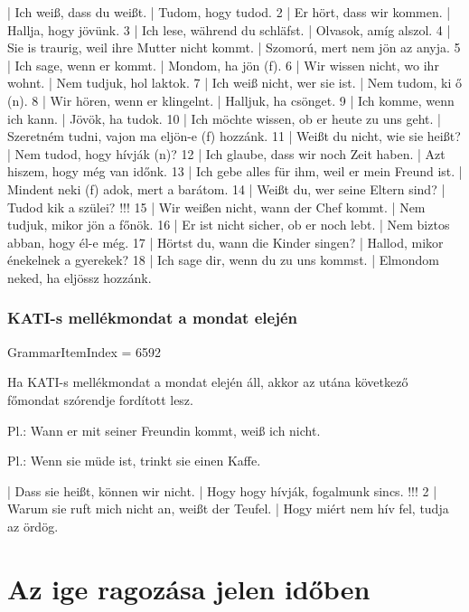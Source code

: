 \documentclass{article}
\newenvironment{desc}{\verbatim}{\endverbatim}
\newenvironment{exmp}{\verbatim}{\endverbatim}
\begin{document}
\begin{exmp}
1 | Ich weiß, dass du weißt. | Tudom, hogy tudod.
2 | Er hört, dass wir kommen. | Hallja, hogy jövünk.
3 | Ich lese, während du schläfst. | Olvasok, amíg alszol.
4 | Sie is traurig, weil ihre Mutter nicht kommt. | Szomorú, mert nem jön az anyja.
5 | Ich sage, wenn er kommt. | Mondom, ha jön (f).
6 | Wir wissen nicht, wo ihr wohnt. | Nem tudjuk, hol laktok.
7 | Ich weiß nicht, wer sie ist. | Nem tudom, ki ő (n).
8 | Wir hören, wenn er klingelnt. | Halljuk, ha csönget.
9 | Ich komme, wenn ich kann. | Jövök, ha tudok.
10 | Ich möchte wissen, ob er heute zu uns geht. | Szeretném tudni, vajon ma eljön-e (f) hozzánk.
11 | Weißt du nicht, wie sie heißt? | Nem tudod, hogy hívják (n)?
12 | Ich glaube, dass wir noch Zeit haben. | Azt hiszem, hogy még van időnk.
13 | Ich gebe alles für ihm, weil er mein Freund ist. | Mindent neki (f) adok, mert a barátom.
14 | Weißt du, wer seine Eltern sind? | Tudod kik a szülei? !!!
15 | Wir weißen nicht, wann der Chef kommt. | Nem tudjuk, mikor jön a főnök.
16 | Er ist nicht sicher, ob er noch lebt. | Nem biztos abban, hogy él-e még.
17 | Hörtst du, wann die Kinder singen? | Hallod, mikor énekelnek a gyerekek?
18 | Ich sage dir, wenn du zu uns kommst. | Elmondom neked, ha eljössz hozzánk.
\end{exmp}

\subsubsection{KATI-s mellékmondat a mondat elején}

GrammarItemIndex = 6592

\begin{desc}
Ha KATI-s mellékmondat a mondat elején áll, akkor az utána következő főmondat szórendje fordított lesz.

Pl.: Wann er mit seiner Freundin kommt, weiß ich nicht.

Pl.: Wenn sie müde ist, trinkt sie einen Kaffe.
\end{desc}

\begin{exmp}
1 | Dass sie heißt, können wir nicht. | Hogy hogy hívják, fogalmunk sincs. !!!
2 | Warum sie ruft mich nicht an, weißt der Teufel. | Hogy miért nem hív fel, tudja az ördög.
\end{exmp}


\section{Az ige ragozása jelen időben}
\end{document}
